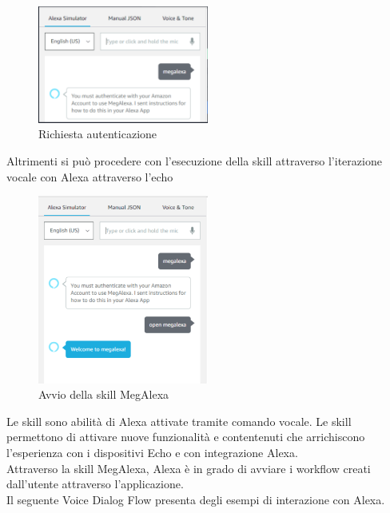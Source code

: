 \begin{itemize}
\begin{figure}[ht]
	\centering
	\includegraphics[width=0.5\textwidth]{images/RichiestaAutenticazione.png}
	\caption{Richiesta autenticazione}
\end{figure}
Altrimenti si può procedere con l'esecuzione della skill attraverso l'iterazione vocale con  Alexa attraverso l'echo





\begin{figure}[!h]
	\centering
	\includegraphics[width=0.5\textwidth]{images/OpenMegAlexa.png}
	\caption{Avvio della skill MegAlexa}
\end{figure}



\end{itemize}

Le skill sono abilità di Alexa attivate tramite comando vocale. Le skill permettono di attivare nuove funzionalità e contentenuti che arrichiscono l'esperienza con i dispositivi Echo e con integrazione Alexa. \\
Attraverso la skill MegAlexa, Alexa è in grado di avviare i workflow creati dall'utente attraverso l'applicazione.\\



Il seguente Voice Dialog Flow  presenta degli esempi di interazione con Alexa.

